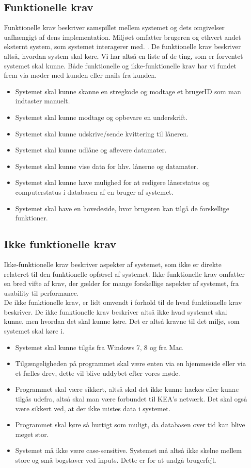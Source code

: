 \documentclass[a4paper]{article}
\begin{document}
\subsection{Funktionelle krav}
Funktionelle krav beskriver samspillet mellem systemet og dets omgivelser uafhængigt af dens implementation. Miljøet omfatter brugeren og ethvert andet eksternt system, som systemet interagerer med. \cite[s.125]{OOSE}. De funktionelle krav beskriver altså, hvordan system skal køre. Vi har altså en liste af de ting, som er forventet systemet skal kunne. Både funktionelle og ikke-funktionelle krav har vi fundet frem via møder med kunden eller mails fra kunden.
\begin{itemize}
	\item Systemet skal kunne skanne en stregkode og modtage et brugerID som man indtaster manuelt.
	\item Systemet skal kunne modtage og opbevare en underskrift.
	\item Systemet skal kunne udskrive/sende kvittering til låneren.
	\item Systemet skal kunne udlåne og aflevere datamater.
	\item Systemet skal kunne vise data for hhv. lånerne og datamater.
	\item Systemet skal kunne have mulighed for at redigere lånerstatus og computerstatus i databasen af en bruger af systemet.
	\item Systemet skal have en hovedeside, hvor brugeren kan tilgå de forskellige funktioner.
\end{itemize}
\newpage
\subsection{Ikke funktionelle krav}
Ikke-funktionelle krav beskriver aspekter af systemet, som ikke er direkte relateret til den funktionelle opførsel af systemet. Ikke-funktionelle krav omfatter en bred vifte af krav, der gælder for mange forskellige aspekter af systemet, fra usability til performance. \cite[s.119]{OOSE} \\ De ikke funktionelle krav, er lidt omvendt i forhold til de hvad funktionelle krav beskriver. De ikke funktionelle krav beskriver altså ikke hvad systemet skal kunne, men hvordan det skal kunne køre. Det er altså kravne til det miljø, som systemet skal køre i.
\begin{itemize}
	\item Systemet skal kunne tilgås fra Windows 7, 8 og fra Mac.
	\item Tilgængeligheden på programmet skal være enten via en hjemmeside eller via et fælles drev, dette vil blive uddybet efter vores møde.
	\item Programmet skal være sikkert, altså skal det ikke kunne hackes eller kunne tilgås udefra, altså skal man være forbundet til KEA's netværk. Det skal også være sikkert ved, at der ikke mistes data i systemet.
	\item Programmet skal køre så hurtigt som muligt, da databasen over tid kan blive meget stor.
	\item Systemet må ikke være case-sensitive. Systemet må altså ikke skelne mellem store og små bogstaver ved inputs. Dette er for at undgå brugerfejl.
\end{itemize}
\newpage
\end{document}
